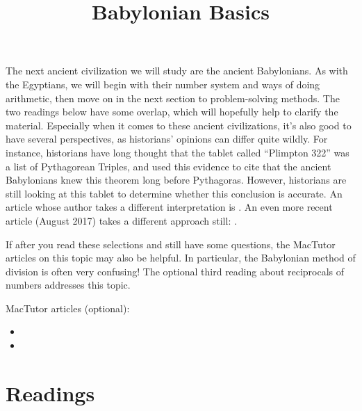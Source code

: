 \documentclass{ximera}
\title{Babylonian Basics}
\begin{document}
\begin{abstract}
\end{abstract}
\maketitle

The next ancient civilization we will study are the ancient Babylonians.  As with the Egyptians, we will begin with their number system and ways of doing arithmetic, then move on in the next section to problem-solving methods.  The two readings below have some overlap, which will hopefully help to clarify the material.  Especially when it comes to these ancient civilizations, it's also good to have several perspectives, as historians' opinions can differ quite wildly.  For instance, historians have long thought that the tablet called ``Plimpton 322'' was a list of Pythagorean Triples, and used this evidence to cite that the ancient Babylonians knew this theorem long before Pythagoras.  However, historians are still looking at this tablet to determine whether this conclusion is accurate.  An article whose author takes a different interpretation is .  An even more recent article (August 2017) takes a different approach still: .

If after you read these selections and still have some questions, the MacTutor articles on this topic may also be helpful.  In particular, the Babylonian method of division is often very confusing!  The optional third reading about reciprocals of numbers addresses this topic.

MacTutor articles (optional):
\begin{itemize}
\item {}
\item {}
\end{itemize}




\section{Readings}
\end{document}
